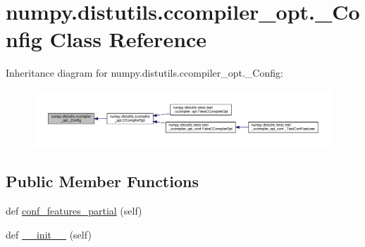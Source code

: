 \hypertarget{classnumpy_1_1distutils_1_1ccompiler__opt_1_1__Config}{}\section{numpy.\+distutils.\+ccompiler\+\_\+opt.\+\_\+\+Config Class Reference}
\label{classnumpy_1_1distutils_1_1ccompiler__opt_1_1__Config}


Inheritance diagram for numpy.\+distutils.\+ccompiler\+\_\+opt.\+\_\+\+Config\+:
\nopagebreak
\begin{figure}[H]
\begin{center}
\leavevmode
\includegraphics[width=350pt]{classnumpy_1_1distutils_1_1ccompiler__opt_1_1__Config__inherit__graph}
\end{center}
\end{figure}
\subsection*{Public Member Functions}
\begin{DoxyCompactItemize}
\item 
def \hyperlink{classnumpy_1_1distutils_1_1ccompiler__opt_1_1__Config_a38c243bb5235bdbff40b404571329068}{conf\+\_\+features\+\_\+partial} (self)
\item 
def \hyperlink{classnumpy_1_1distutils_1_1ccompiler__opt_1_1__Config_a36e5bd04020d2296c5a6d5955ebaf69d}{\+\_\+\+\_\+init\+\_\+\+\_\+} (self)
\end{DoxyCompactItemize}
